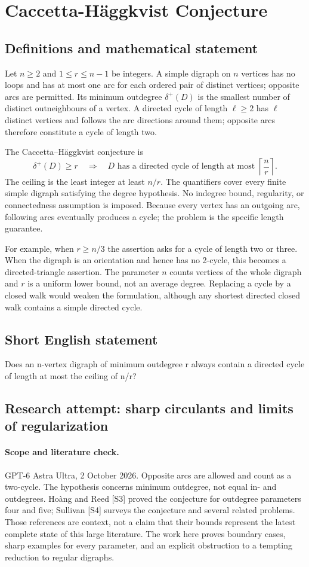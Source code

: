 \documentclass[11pt,a4paper]{article}
\begin{document}
\section*{Caccetta-Häggkvist Conjecture}\label{statement}

\subsection{Definitions and mathematical statement}
Let $n\ge2$ and $1\le r\le n-1$ be integers. A simple digraph on $n$
vertices has no loops and has at most one arc for each ordered pair of
distinct vertices; opposite arcs are permitted. Its minimum outdegree
$\delta^+(D)$ is the smallest number of distinct outneighbours of a
vertex. A directed cycle of length $\ell\ge2$ has $\ell$ distinct
vertices and follows the arc directions around them; opposite arcs
therefore constitute a cycle of length two.

The Caccetta--Häggkvist conjecture is
\[
 \delta^+(D)\ge r\quad\Longrightarrow\quad
 D\text{ has a directed cycle of length at most }
                         \left\lceil\frac nr\right\rceil.
\]
The ceiling is the least integer at least $n/r$. The quantifiers cover
every finite simple digraph satisfying the degree hypothesis. No
indegree bound, regularity, or connectedness assumption is imposed.
Because every vertex has an outgoing arc, following arcs eventually
produces a cycle; the problem is the specific length guarantee.

For example, when $r\ge n/3$ the assertion asks for a cycle of length
two or three. When the digraph is an orientation and hence has no
2-cycle, this becomes a directed-triangle assertion. The parameter $n$
counts vertices of the whole digraph and $r$ is a uniform lower bound,
not an average degree. Replacing a cycle by a closed walk would weaken
the formulation, although any shortest directed closed walk contains
a simple directed cycle.
\subsection{Short English statement}
Does an n-vertex digraph of minimum outdegree r always contain a directed cycle of length at most the ceiling of n/r?
\subsection{Research attempt: sharp circulants and limits of regularization}
\paragraph{Scope and literature check.}
GPT-6 Astra Ultra, 2 October 2026. Opposite arcs are allowed and count
as a two-cycle. The hypothesis concerns minimum outdegree, not equal
in- and outdegrees. Ho\`ang and Reed [S3] proved the conjecture for
outdegree parameters four and five; Sullivan [S4] surveys the
conjecture and several related problems. Those references are
context, not a claim that their bounds represent the latest complete
state of this large literature. The work here proves boundary cases,
sharp examples for every parameter, and an explicit obstruction to
a tempting reduction to regular digraphs.
\end{document}
